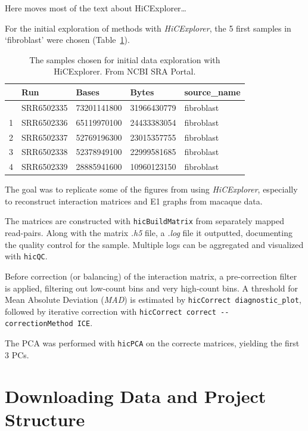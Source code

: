 \documentclass[
  11pt,
  a4paper,
]{scrbook}
\let\oldemph\emph
\renewcommand\emph[1]{\oldemph{\color{gray}#1}}
\begin{document}
Here moves most of the text about HiCExplorer\ldots{}

For the initial exploration of methods with \emph{HiCExplorer}, the 5
first samples in `fibroblast' were chosen
(Table~\ref{tbl-hic-exploration}).

\small

\begin{longtable}[]{@{}lllll@{}}

\caption{\label{tbl-hic-exploration}The samples chosen for initial data
exploration with HiCExplorer. From NCBI SRA Portal.}

\tabularnewline

\toprule\noalign{}
& Run & Bases & Bytes & source\_name \\
\midrule\noalign{}
\endhead
\bottomrule\noalign{}
\endlastfoot
0 & SRR6502335 & 73201141800 & 31966430779 & fibroblast \\
1 & SRR6502336 & 65119970100 & 24433383054 & fibroblast \\
2 & SRR6502337 & 52769196300 & 23015357755 & fibroblast \\
3 & SRR6502338 & 52378949100 & 22999581685 & fibroblast \\
4 & SRR6502339 & 28885941600 & 10960123150 & fibroblast \\

\end{longtable}

\normalsize

The goal was to replicate some of the figures from
\citet{wang_reprogramming_2019} using \emph{HiCExplorer}, especially to
reconstruct interaction matrices and E1 graphs from macaque data.

The matrices are constructed with \texttt{hicBuildMatrix} from
separately mapped read-pairs. Along with the matrix \emph{.h5} file, a
\emph{.log} file it outputted, documenting the quality control for the
sample. Multiple logs can be aggregated and visualized with
\texttt{hicQC}.

Before correction (or balancing) of the interaction matrix, a
pre-correction filter is applied, filtering out low-count bins and very
high-count bins. A threshold for Mean Absolute Deviation (\emph{MAD}) is
estimated by \texttt{hicCorrect\ diagnostic\_plot}, followed by
iterative correction with
\texttt{hicCorrect\ correct\ -\/-correctionMethod\ ICE}.

The PCA was performed with \texttt{hicPCA} on the correcte matrices,
yielding the first 3 PCs.

\section{Downloading Data and Project
Structure}\label{downloading-data-and-project-structure}
\end{document}

